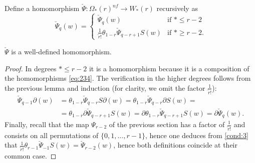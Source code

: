 \begin{definition}
	Define a homomorphism $\check{\Psi}\colon \Omega_*(r)^{nf}\to W_*(r)$ recursively as
	\[\check{\Psi}_q(w) = \begin{cases} \check{\Psi}_q(w) & \text{if $*\leq r-2$} \\
		\frac{1}{\tilde{r}!}\theta_{1-r}\check{\Psi}_{q-r+1}S(w) & \text{if $*\geq r-2$.}\end{cases}\]
\end{definition}

\begin{lemma}
	$\check{\Psi}$ is a well-defined homomorphism. %
\end{lemma}

\begin{proof}
	In degrees $*\leq r-2$ it is a homomorphism because it is a composition of the homomorphisms \eqref{eq:234}. The verification in the higher degrees follows from the previous lemma and induction (for clarity, we omit the factor $\frac{1}{\tilde{r}!}$):
	\begin{align*}
		\check{\Psi}_{q-1}\partial(w) &= \theta_{1-r}\check{\Psi}_{q-r}S\partial(w) = \theta_{1-r}\check{\Psi}_{q-r}\partial S(w) = \\
		&=\theta_{1-r}\partial\check{\Psi}_{q-r+1}S(w) = \partial\theta_{1-r}\check{\Psi}_{q-r+1}S(w) = \partial \check{\Psi}_{q}(w).
	\end{align*}
	Finally, recall that the map $\Psi_{r-2}$ of the previous section has a factor of $\frac{1}{\tilde{r}!}$ and consists on all permutations of $\{0,1,\ldots,r-1\}$, hence one deduces from \eqref{cond:3} that $\frac{1}{\tilde{r}!}\theta_{r-1}\check{\Psi}_{-1}S(w) = \check{\Psi}_{r-2}(w)$, hence both definitions coincide at their common case.
\end{proof}

